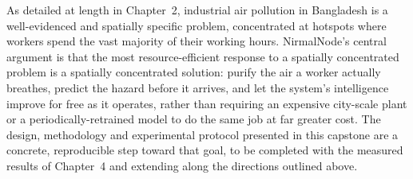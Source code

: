 As detailed at length in Chapter~2, industrial air pollution in Bangladesh is a well-evidenced and spatially specific problem, concentrated at hotspots where workers spend the vast majority of their working hours. NirmalNode’s central argument is that the most resource-efficient response to a spatially concentrated problem is a spatially concentrated solution: purify the air a worker actually breathes, predict the hazard before it arrives, and let the system’s intelligence improve for free as it operates, rather than requiring an expensive city-scale plant or a periodically-retrained model to do the same job at far greater cost. The design, methodology and experimental protocol presented in this capstone are a concrete, reproducible step toward that goal, to be completed with the measured results of Chapter~4 and extending along the directions outlined above.
